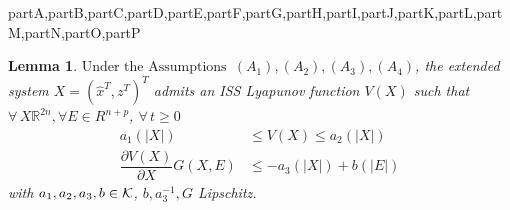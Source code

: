 \documentclass[letterpaper, 10 pt, conference]{ieeeconf}
\def\compile{partA,partB,partC,partD,partE,partF,partG,partH,partI,partJ,partK,partL,partM,partN,partO,partP}
\newenvironment{partF}[1][]{}{}
\newenvironment{partG}[1][]{}{}  \newenvironment{partH}[1][]{}{}
\newtheorem{lemma}{Lemma}
\newcommand{\R}{\mathbb{R}}
\begin{document}
\begin{xcomment}{\compile}
\begin{partE}
\end{partE}
\begin{partF}


\medskip
\begin{lemma}\label{lemma1}  
$\text{Under the Assumptions}$~$(A_1),(A_2),(A_3),(A_4)$, the extended system $X=(\hat x^T,z^T)^T$ admits an ISS Lyapunov function $V(X)$ such that $\forall\, X \R^{2n},\forall E\in R^{n+p}$, $\forall\,t\ge0$
$$
\begin{aligned}
a_1(|X|)&\le V(X)\le a_2(|X|)  \\
\dfrac{\partial V(X)}{\partial X}G(X,E)&\le -a_3(|X|) +b(|E|) 
\end{aligned}
$$
with $a_1,a_2,a_3,b\in{\cal K}$, $b,a_3^{-1},G$ Lipschitz.
\end{lemma}

\end{partF}
\begin{partG} 


\end{partG}
\end{xcomment}
\end{document}
